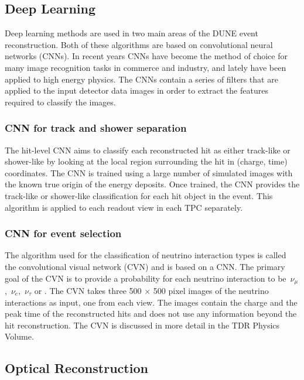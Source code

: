 \subsection{Deep Learning}\label{sec:deeplearning}
Deep learning methods are used %
in two main areas of the DUNE event reconstruction. %
Both of these algorithms are based on convolutional neural networks (CNNs). 
In recent years CNNs have become the method of choice for many image recognition tasks in commerce and industry, and lately have been applied to high energy physics. The CNNs contain a series of filters that are applied to the input detector data images in order to extract the features required to classify the images.

\subsubsection{CNN for track and shower separation}
The hit-level CNN aims to classify each reconstructed hit as either track-like or shower-like by looking at the local region surrounding the hit in (charge, time) coordinates.  The CNN is trained using a large number of simulated images with the known true origin of the energy deposits. Once trained, the CNN provides the track-like or shower-like classification for each hit object in the event. This algorithm is applied to each readout view in each TPC separately. %

\subsubsection{CNN for event selection}
The algorithm used for the classification of neutrino interaction types is called the convolutional visual network (CVN)  and is  based on a CNN. The primary goal of the CVN is to provide a probability for each neutrino interaction to be $\,\nu_\mu$, $\,\nu_e$, $\,\nu_\tau$ or . The CVN takes three 500 $\times$ 500 pixel images of the neutrino interactions as input, one from each view. The images contain the charge and the peak time of the reconstructed hits and does not use any information beyond the hit reconstruction. The CVN is discussed in more detail in the TDR Physics Volume. 

\subsection{Optical Reconstruction}

